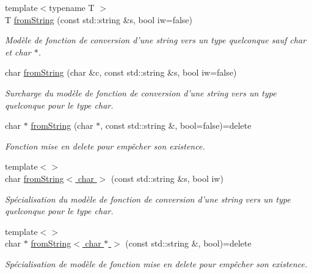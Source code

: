 \begin{DoxyCompactItemize}
{\footnotesize template$<$typename T $>$ }\\T \hyperlink{namespacenvs_a468a98727d8c71fb9e39bd6cf450b11c}{from\+String} (const std\+::string \&s, bool iw=false)
\begin{DoxyCompactList}\small\item\em Modèle de fonction de conversion d'une {\ttfamily string} vers un type quelconque {\itshape sauf} {\ttfamily char} et {\ttfamily char $\ast$}. \end{DoxyCompactList}\item 
char \hyperlink{namespacenvs_a6faa2c67b8c1b7b03505651c3da39cad}{from\+String} (char \&c, const std\+::string \&s, bool iw=false)
\begin{DoxyCompactList}\small\item\em Surcharge du modèle de fonction de conversion d'une {\ttfamily string} vers un type quelconque pour le type {\ttfamily char}. \end{DoxyCompactList}\item 
char $\ast$ \hyperlink{namespacenvs_a2024eba3f88b698e2c476531f0b3a7e1}{from\+String} (char $\ast$, const std\+::string \&, bool=false)=delete
\begin{DoxyCompactList}\small\item\em Fonction mise en {\ttfamily delete} pour empêcher son existence. \end{DoxyCompactList}\item 
{\footnotesize template$<$$>$ }\\char \hyperlink{namespacenvs_a6220ac48bcd3f635f46ddb966d29b4b1}{from\+String$<$ char $>$} (const std\+::string \&s, bool iw)
\begin{DoxyCompactList}\small\item\em Spécialisation du modèle de fonction de conversion d'une {\ttfamily string} vers un type quelconque pour le type {\ttfamily char}. \end{DoxyCompactList}\item 
{\footnotesize template$<$$>$ }\\char $\ast$ \hyperlink{namespacenvs_a7d4923e0e44d1b0274275f6292cb6fd6}{from\+String$<$ char $\ast$ $>$} (const std\+::string \&, bool)=delete
\begin{DoxyCompactList}\small\item\em Spécialisation de modèle de fonction mise en {\ttfamily delete} pour empêcher son existence. \end{DoxyCompactList}\end{DoxyCompactItemize}


